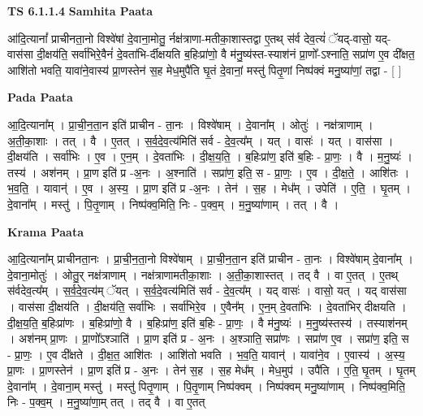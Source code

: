 \documentclass[17pt]{extarticle}
\begin{document}
\textbf{TS 6.1.1.4 } \newline
\textbf{Samhita Paata} \newline

आ॑दि॒त्यानां᳚ प्राचीनता॒नो विश्वे॑षां दे॒वाना॒मोतु॒ र्नक्ष॑त्राणा-मतीका॒शास्तद्वा ए॒तथ् स॑र्व देव॒त्यं॑ ॅयद्-वासो॒ यद्-वास॑सा दी॒क्षय॑ति॒ सर्वा॑भिरे॒वैनं॑ दे॒वता॑भि-र्दीक्षयति ब॒हिःप्रा॑णो॒ वै म॑नु॒ष्य॑स्त-स्याश॑नं प्रा॒णो᳚-ऽश्नाति॒ सप्रा॑ण ए॒व दी᳚क्षत॒ आशि॑तो भवति॒ यावा॑ने॒वास्य॑ प्रा॒णस्तेन॑ स॒ह मेध॒मुपै॑ति घृ॒तं दे॒वानां॒ मस्तु॑ पितृ॒णां निष्प॑क्वं मनु॒ष्या॑णां॒ तद्वा - [  ] \newline

\textbf{Pada Paata} \newline

आ॒दि॒त्याना᳚म् । प्रा॒ची॒न॒ता॒न इति॑ प्राचीन - ता॒नः । विश्वे॑षाम् । दे॒वाना᳚म् । ओतुः॑ । नक्ष॑त्राणाम् । अ॒ती॒का॒शाः । तत् । वै । ए॒तत् । स॒र्व॒दे॒व॒त्य॑मिति॑ सर्व - दे॒व॒त्य᳚म् । यत् । वासः॑ । यत् । वास॑सा । दी॒क्षय॑ति । सर्वा॑भिः । ए॒व । ए॒न॒म् । दे॒वता॑भिः । दी॒क्ष॒य॒ति॒ । ब॒हिःप्रा॑ण॒ इति॑ ब॒हिः - प्रा॒णः॒ । वै । म॒नु॒ष्यः॑ । तस्य॑ । अश॑नम् । प्रा॒ण इति॑ प्र -अ॒नः । अ॒श्नाति॑ । सप्रा॑ण॒ इति॒ स - प्रा॒णः॒ । ए॒व । दी॒क्ष॒ते॒ । आशि॑तः । भ॒व॒ति॒ । यावान्॑ । ए॒व । अ॒स्य॒ । प्रा॒ण इति॑ प्र -अ॒नः । तेन॑ । स॒ह । मेध᳚म् । उपेति॑ । ए॒ति॒ । घृ॒तम् । दे॒वाना᳚म् । मस्तु॑ । पि॒तृ॒णाम् । निष्प॑क्व॒मिति॒ निः - प॒क्व॒म् । म॒नु॒ष्या॑णाम् । तत् । वै ।  \newline


\textbf{Krama Paata} \newline

आ॒दि॒त्याना᳚म् प्राचीनता॒नः । प्रा॒ची॒न॒ता॒नो विश्वे॑षाम् । प्रा॒ची॒न॒ता॒न इति॑ प्राचीन - ता॒नः । विश्वे॑षाम् दे॒वाना᳚म् । दे॒वाना॒मोतुः॑ । ओतु॒र् नक्ष॑त्राणाम् । नक्ष॑त्राणामतीका॒शाः । अ॒ती॒का॒शास्तत् । तद् वै । वा ए॒तत् । ए॒तथ् स॑र्वदेव॒त्य᳚म् । स॒र्व॒दे॒व॒त्य॑म् ॅयत् । स॒र्व॒दे॒वत्य॑मिति॑ सर्व - दे॒व॒त्य᳚म् । यद् वासः॑ । वासो॒ यत् । यद् वास॑सा । वास॑सा दी॒क्षय॑ति । दी॒क्षय॑ति॒ सर्वा॑भिः । सर्वा॑भिरे॒व । ए॒वैन᳚म् । ए॒न॒म् दे॒वता॑भिः । दे॒वता॑भिर् दीक्षयति । दी॒क्ष॒य॒ति॒ ब॒हिःप्रा॑णः । ब॒हिःप्रा॑णो॒ वै । ब॒हिःप्रा॑ण॒ इति॑ ब॒हिः - प्रा॒णः॒ । वै म॑नु॒ष्यः॑ । म॒नु॒ष्य॑स्तस्य॑ । तस्याश॑नम् । अश॑नम् प्रा॒णः । प्रा॒णो᳚ऽश्ञाति॑ । प्रा॒ण इति॑ प्र - अ॒नः । अ॒श्ञाति॒ सप्रा॑णः । सप्रा॑ण ए॒व । सप्रा॑ण॒ इति॒ स - प्रा॒णः॒ । ए॒व दी᳚क्षते । दी॒क्ष॒त॒ आशि॑तः । आशि॑तो भवति । भ॒व॒ति॒ यावान्॑ । यावा॑ने॒व । ए॒वास्य॑ । अ॒स्य॒ प्रा॒णः । प्रा॒णस्तेन॑ । प्रा॒ण इति॑ प्र - अ॒नः । तेन॑ स॒ह । स॒ह मेध᳚म् । मेध॒मुप॑ । उपै॑ति । ए॒ति॒ घृ॒तम् । घृ॒तम् दे॒वाना᳚म् । दे॒वाना॒म् मस्तु॑ । मस्तु॑ पितृ॒णाम् । पि॒तृ॒णाम् निष्प॑क्वम् । निष्प॑क्वम् मनु॒ष्या॑णाम् । निष्प॑क्व॒मिति॒ निः - प॒क्व॒म् । म॒नु॒ष्या॑णा॒म् तत् । तद् वै । वा ए॒तत् \newline
\end{document}
